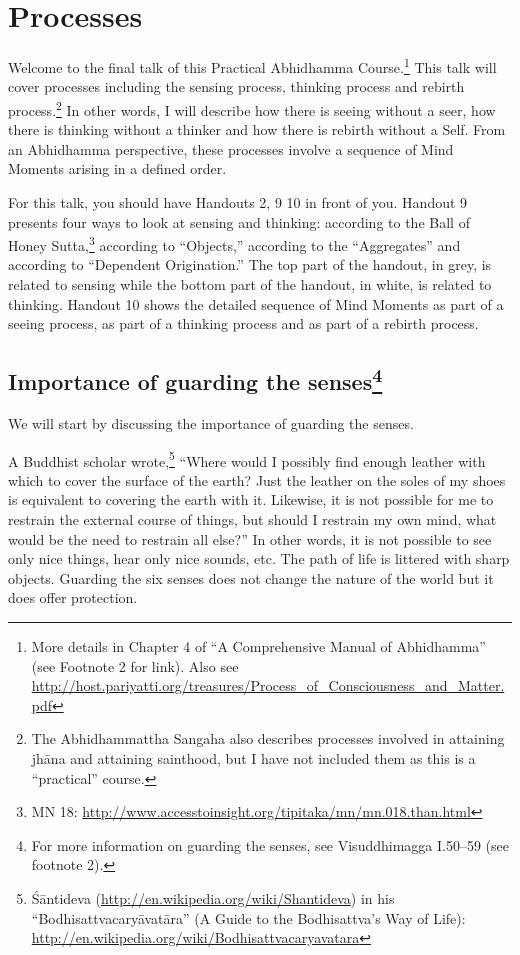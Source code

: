 \section{Processes}

Welcome to the final talk of this Practical Abhidhamma Course.\footnote{More details in Chapter 4 of “A Comprehensive Manual of Abhidhamma” (see Footnote 2 for link). \newline Also see \url{http://host.pariyatti.org/treasures/Process_of_Consciousness_and_Matter.pdf}} This talk will cover processes including the sensing process, thinking process and rebirth process.\footnote{The Abhidhammattha Sangaha also describes processes involved in attaining jhāna and attaining sainthood, but I have not included them as this is a “practical” course.} In other words, I will describe how there is seeing without a seer, how there is thinking without a thinker and how there is rebirth without a Self. From an Abhidhamma perspective, these processes involve a sequence of Mind Moments arising in a defined order.

For this talk, you should have Handouts 2, 9 10 in front of you. Handout 9 presents four ways to look at sensing and thinking: according to the Ball of Honey Sutta,\footnote{MN 18: \url{http://www.accesstoinsight.org/tipitaka/mn/mn.018.than.html}} according to “Objects,” according to the “Aggregates” and according to “Dependent Origination.” The top part of the handout, in grey, is related to sensing while the bottom part of the handout, in white, is related to thinking. Handout 10 shows the detailed sequence of Mind Moments as part of a seeing process, as part of a thinking process and as part of a rebirth process.

\subsection*{Importance of guarding the senses\footnote{For more information on guarding the senses, see Visuddhimagga I.50--59 (see footnote 2).}}

We will start by discussing the importance of guarding the senses.

A Buddhist scholar wrote,\footnote{Śāntideva (\url{http://en.wikipedia.org/wiki/Shantideva}) in his “Bodhisattvacaryāvatāra” (A Guide to the Bodhisattva’s Way of Life): \url{http://en.wikipedia.org/wiki/Bodhisattvacaryavatara}} “Where would I possibly find enough leather with which to cover the surface of the earth? Just the leather on the soles of my shoes is equivalent to covering the earth with it. Likewise, it is not possible for me to restrain the external course of things, but should I restrain my own mind, what would be the need to restrain all else?” In other words, it is not possible to see only nice things, hear only nice sounds, etc. The path of life is littered with sharp objects. Guarding the six senses does not change the nature of the world but it does offer protection.

